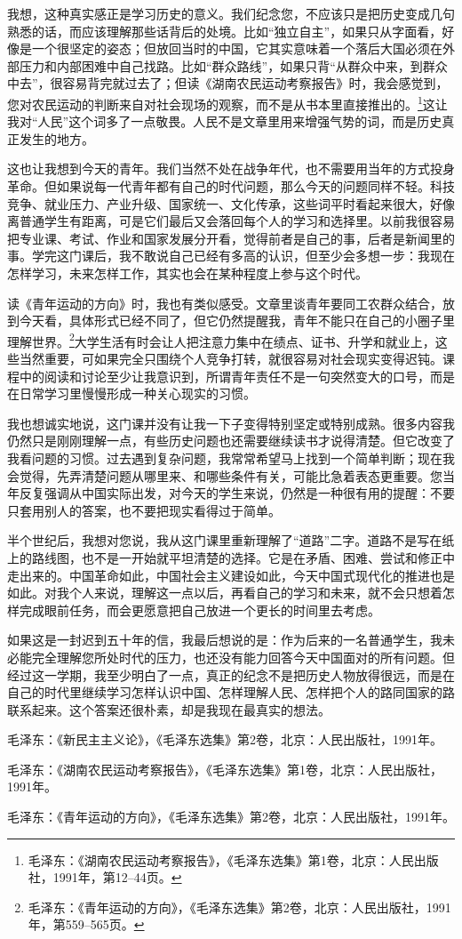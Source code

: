 \documentclass[12pt,a4paper]{ctexart}
\begin{document}
{我想，这种真实感正是学习历史的意义。我们纪念您，不应该只是把历史变成几句熟悉的话，而应该理解那些话背后的处境。比如“独立自主”，如果只从字面看，好像是一个很坚定的姿态；但放回当时的中国，它其实意味着一个落后大国必须在外部压力和内部困难中自己找路。比如“群众路线”，如果只背“从群众中来，到群众中去”，很容易背完就过去了；但读《湖南农民运动考察报告》时，我会感觉到，您对农民运动的判断来自对社会现场的观察，而不是从书本里直接推出的。\footnote{毛泽东：《湖南农民运动考察报告》，《毛泽东选集》第1卷，北京：人民出版社，1991年，第12--44页。}这让我对“人民”这个词多了一点敬畏。人民不是文章里用来增强气势的词，而是历史真正发生的地方。

这也让我想到今天的青年。我们当然不处在战争年代，也不需要用当年的方式投身革命。但如果说每一代青年都有自己的时代问题，那么今天的问题同样不轻。科技竞争、就业压力、产业升级、国家统一、文化传承，这些词平时看起来很大，好像离普通学生有距离，可是它们最后又会落回每个人的学习和选择里。以前我很容易把专业课、考试、作业和国家发展分开看，觉得前者是自己的事，后者是新闻里的事。学完这门课后，我不敢说自己已经有多高的认识，但至少会多想一步：我现在怎样学习，未来怎样工作，其实也会在某种程度上参与这个时代。

读《青年运动的方向》时，我也有类似感受。文章里谈青年要同工农群众结合，放到今天看，具体形式已经不同了，但它仍然提醒我，青年不能只在自己的小圈子里理解世界。\footnote{毛泽东：《青年运动的方向》，《毛泽东选集》第2卷，北京：人民出版社，1991年，第559--565页。}大学生活有时会让人把注意力集中在绩点、证书、升学和就业上，这些当然重要，可如果完全只围绕个人竞争打转，就很容易对社会现实变得迟钝。课程中的阅读和讨论至少让我意识到，所谓青年责任不是一句突然变大的口号，而是在日常学习里慢慢形成一种关心现实的习惯。

我也想诚实地说，这门课并没有让我一下子变得特别坚定或特别成熟。很多内容我仍然只是刚刚理解一点，有些历史问题也还需要继续读书才说得清楚。但它改变了我看问题的习惯。过去遇到复杂问题，我常常希望马上找到一个简单判断；现在我会觉得，先弄清楚问题从哪里来、和哪些条件有关，可能比急着表态更重要。您当年反复强调从中国实际出发，对今天的学生来说，仍然是一种很有用的提醒：不要只套用别人的答案，也不要把现实看得过于简单。

半个世纪后，我想对您说，我从这门课里重新理解了“道路”二字。道路不是写在纸上的路线图，也不是一开始就平坦清楚的选择。它是在矛盾、困难、尝试和修正中走出来的。中国革命如此，中国社会主义建设如此，今天中国式现代化的推进也是如此。对我个人来说，理解这一点以后，再看自己的学习和未来，就不会只想着怎样完成眼前任务，而会更愿意把自己放进一个更长的时间里去考虑。

如果这是一封迟到五十年的信，我最后想说的是：作为后来的一名普通学生，我未必能完全理解您所处时代的压力，也还没有能力回答今天中国面对的所有问题。但经过这一学期，我至少明白了一点，真正的纪念不是把历史人物放得很远，而是在自己的时代里继续学习怎样认识中国、怎样理解人民、怎样把个人的路同国家的路联系起来。这个答案还很朴素，却是我现在最真实的想法。

\vspace{1em}

\noindent [1] 毛泽东：《新民主主义论》，《毛泽东选集》第2卷，北京：人民出版社，1991年。

\noindent [2] 毛泽东：《湖南农民运动考察报告》，《毛泽东选集》第1卷，北京：人民出版社，1991年。

\noindent [3] 毛泽东：《青年运动的方向》，《毛泽东选集》第2卷，北京：人民出版社，1991年。

}
\end{document}

